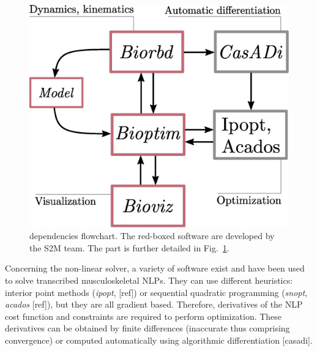 \begin{figure}[t!]
\centering
\includegraphics[width=0.9\columnwidth]{figures/dependencies.eps}
\caption{\bioptim dependencies flowchart. The red-boxed software are developed by the S2M team. The \bioptim part is further detailed in Fig.~\ref{fig:dependencies}.}
\label{fig:dependencies}
\vspace*{-0.5cm}
\end{figure}

Concerning the non-linear solver, a variety of software exist and have been used to solve transcribed musculoskeletal NLPs.
They can use different heuristics: interior point methods (\textit{ipopt}, [ref]) or sequential quadratic programming (\textit{snopt}, \textit{acados} [ref]), but they are all gradient based.
Therefore, derivatives of the NLP cost function and constraints are required to perform optimization.
These derivatives can be obtained by finite differences (inaccurate thus comprising convergence) or computed automatically using algorithmic differentiation [casadi].

